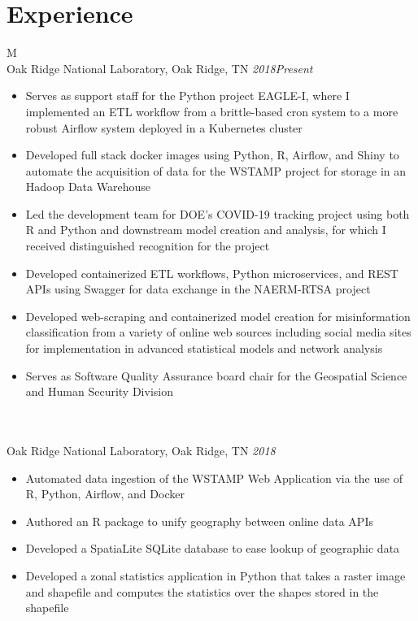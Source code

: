 \documentclass[10pt]{article}%
\begin{document}
\section*{\faCalendar{} Experience}
   \begin{tabularx}{\linewidth}{M}%
       \\
      Oak Ridge National Laboratory, Oak Ridge, TN \textit{2018\textemdash Present} \\
      \begin{itemize}[topsep=-12pt,parsep=0em]
          \setlength\itemsep{0em}
          \item Serves as support staff for the Python project EAGLE-I, where I implemented an ETL workflow from a brittle-based cron system to a more robust Airflow system deployed in a Kubernetes cluster %
          \item Developed full stack docker images using Python, R, Airflow,  and Shiny to automate the acquisition of data for the WSTAMP project for storage in an Hadoop Data Warehouse %
          \item Led the development team for DOE's COVID-19 tracking project using both R and Python and downstream model creation and analysis, for which I received distinguished recognition for the project %
          \item Developed containerized ETL workflows, Python microservices, and REST APIs using Swagger for data exchange in the NAERM-RTSA project %
          \item Developed web-scraping and containerized model creation for misinformation classification from a variety of online web sources including social media sites for implementation in advanced statistical models and network analysis %
          \item Serves as Software Quality Assurance board chair for the Geospatial Science and Human Security Division %
      \end{itemize} \\
            \\
      Oak Ridge National Laboratory, Oak Ridge, TN \textit{2018 } \\
      \begin{itemize}[topsep=-12pt,parsep=0em]
          \setlength\itemsep{0em}
          \item Automated data ingestion of the WSTAMP Web Application via the use of R, Python, Airflow, and Docker %
          \item Authored an R package to unify geography between online data APIs %
          \item Developed a SpatiaLite SQLite database to ease lookup of geographic data %
          \item Developed a zonal statistics application in Python that takes a raster image and shapefile and computes the statistics over the shapes stored in the shapefile %
        \end{itemize} \\
   \end{tabularx}
\end{document}
